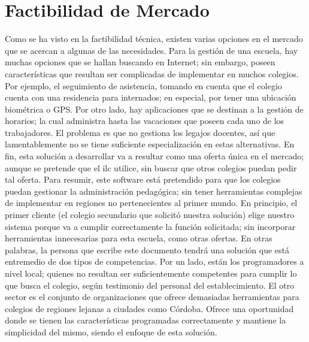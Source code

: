 \section{Factibilidad de Mercado}
\normalsize{ \indent
Como se ha visto en la factibilidad técnica, existen
varias opciones en el mercado que se acercan a algunas
de las necesidades. Para la gestión de una escuela, hay
muchas opciones que se hallan buscando en Internet; sin
embargo, poseen características que resultan ser
complicadas de implementar en muchos colegios. Por
ejemplo, el seguimiento de asistencia, tomando en cuenta
que el colegio cuenta con una residencia para internados;
en especial, por tener una ubicación biométrica o GPS.
}
\newline
\normalsize{ \indent
Por otro lado, hay aplicaciones que se destinan a la
gestión de horarios; la cual administra hasta las
vacaciones que poseen cada uno de los trabajadores. El
problema es que no gestiona los legajos docentes, así
que lamentablemente no se tiene suficiente
especialización en estas alternativas. En fin, esta
solución a desarrollar va a resultar como una oferta
única en el mercado; aunque se pretende que el
\acrshort{ilc} utilice, sin buscar que otros colegios
puedan pedir tal oferta.
}
\newline
\normalsize{ \indent
Para resumir, este software está pretendido para que
los colegios puedan gestionar la administración pedagógica;
sin tener herramientas complejas de implementar en
regiones no pertenecientes al primer mundo. En principio,
el primer cliente (el colegio secundario que solicitó
nuestra solución) elige nuestro sistema porque va a cumplir
correctamente la función solicitada; sin incorporar
herramientas innecesarias para esta escuela, como otras
ofertas.
}
\newline
\normalsize{ \indent
En otras palabras, la persona que escribe este documento
tendrá una solución que está entremedio de dos tipos de
competencias. Por un lado, están los programadores a nivel
local; quienes no resultan ser suficientemente competentes
para cumplir lo que busca el colegio, según testimonio del
personal del establecimiento. El otro sector es el conjunto
de organizaciones que ofrece demasiadas herramientas para
colegios de regiones lejanas a ciudades como Córdoba.
Ofrece una oportunidad donde se tienen las características
programadas correctamente y mantiene la simplicidad del
mismo, siendo el enfoque de esta solución.
}
